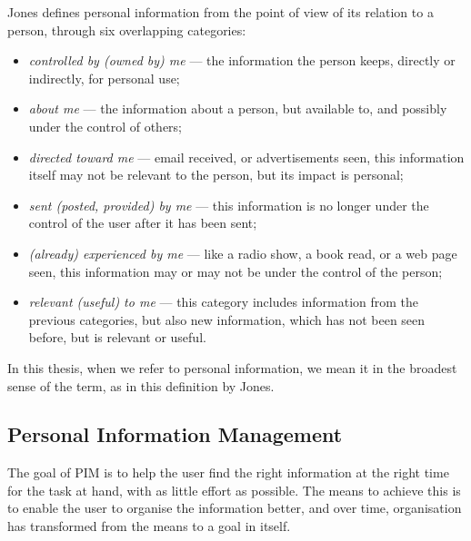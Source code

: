 Jones \cite{Jones2007PIMBook,Jones2008KFTFBook} defines personal information from the point of view of its relation to a person, through six overlapping categories:
\begin{itemize}
 \item \emph{controlled by (owned by) me} --- the information the person keeps, directly or indirectly, for personal use;
 \item \emph{about me} --- the information about a person, but available to, and possibly under the control of others;
 \item \emph{directed toward me} --- email received, or advertisements seen, this information itself may not be relevant to the person, but its impact is personal;
 \item \emph{sent (posted, provided) by me} --- this information is no longer under the control of the user after it has been sent;
 \item \emph{(already) experienced by me} --- like a radio show, a book read, or a web page seen, this information may or may not be under the control of the person;
 \item \emph{relevant (useful) to me} --- this category includes information from the previous categories, but also new information, which has not been seen before, but is relevant or useful.
\end{itemize}
In this thesis, when we refer to personal information, we mean it in the broadest sense of the term, as in this definition by Jones.

\subsection{Personal Information Management}
\label{sub:pim}

The goal of PIM is to help the user find the right information at the right time for the task at hand, with as little effort as possible. The means to achieve this is to enable the user to organise the information better, and over time, organisation has transformed from the means to a goal in itself. 

